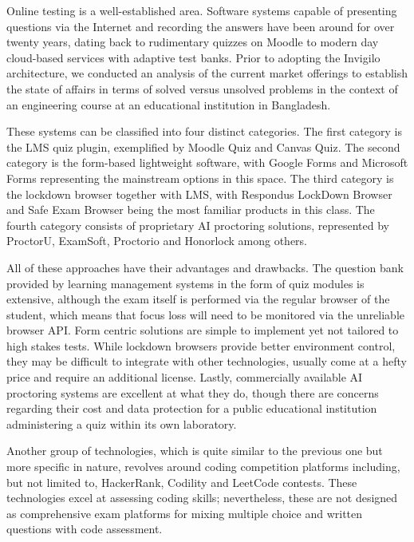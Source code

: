 \documentclass[12pt, a4paper]{report}
\begin{document}
\begin{justify}
  {\fontsize{12}{18}\selectfont
    Online testing is a well-established area. Software systems capable of presenting questions via the Internet and recording the answers have been around for over twenty years, dating back to rudimentary quizzes on Moodle to modern day cloud-based services with adaptive test banks. Prior to adopting the Invigilo architecture, we conducted an analysis of the current market offerings to establish the state of affairs in terms of solved versus unsolved problems in the context of an engineering course at an educational institution in Bangladesh.

    These systems can be classified into four distinct categories. The first category is the LMS quiz plugin, exemplified by Moodle Quiz and Canvas Quiz. The second category is the form-based lightweight software, with Google Forms and Microsoft Forms representing the mainstream options in this space. The third category is the lockdown browser together with LMS, with Respondus LockDown Browser and Safe Exam Browser being the most familiar products in this class. The fourth category consists of proprietary AI proctoring solutions, represented by ProctorU, ExamSoft, Proctorio and Honorlock among others.

    All of these approaches have their advantages and drawbacks. The question bank provided by learning management systems in the form of quiz modules is extensive, although the exam itself is performed via the regular browser of the student, which means that focus loss will need to be monitored via the unreliable browser API. Form centric solutions are simple to implement yet not tailored to high stakes tests. While lockdown browsers provide better environment control, they may be difficult to integrate with other technologies, usually come at a hefty price and require an additional license. Lastly, commercially available AI proctoring systems are excellent at what they do, though there are concerns regarding their cost and data protection for a public educational institution administering a quiz within its own laboratory.

    Another group of technologies, which is quite similar to the previous one but more specific in nature, revolves around coding competition platforms including, but not limited to, HackerRank, Codility and LeetCode contests. These technologies excel at assessing coding skills; nevertheless, these are not designed as comprehensive exam platforms for mixing multiple choice and written questions with code assessment.

}
\end{justify}
\end{document}
